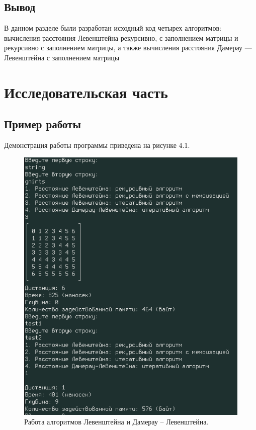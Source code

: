 \documentclass[12pt]{report}
\begin{document}
\section{Вывод}
В данном разделе были разработан исходный код четырех алгоритмов: вычисления расстояния Левенштейна рекурсивно, с заполнением матрицы
и рекурсивно с заполнением матрицы, а также вычисления расстояния
Дамерау — Левенштейна с заполнением матрицы

\chapter{Исследовательская часть}

\section{Пример работы}

Демонстрация работы программы приведена на рисунке 4.1.

\begin{figure}[h]
	\begin{center}
	\includegraphics[scale=0.7]{primer.png}
	 \caption{Работа алгоритмов Левенштейна и Дамерау -- Левенштейна.}
	\end{center}
\end{figure}
\end{document}
